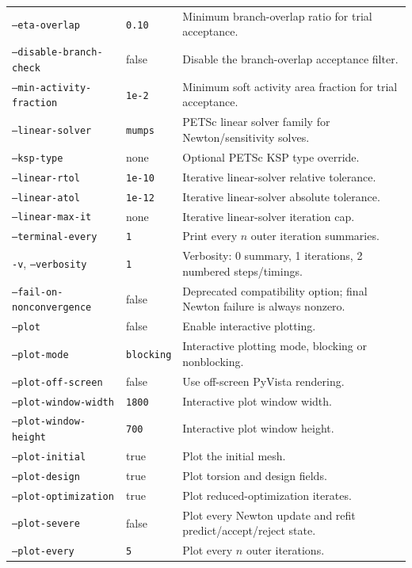 \documentclass[11pt]{article}
\begin{document}
\begin{longtable}{>{\raggedright\arraybackslash}p{}
                  >{\raggedright\arraybackslash}p{}
                  >{\raggedright\arraybackslash}p{}}
\texttt{--eta-overlap} & \texttt{0.10} & Minimum branch-overlap ratio for trial acceptance. \\
\texttt{--disable-branch-check} & false & Disable the branch-overlap acceptance filter. \\
\texttt{--min-activity-fraction} & \texttt{1e-2} & Minimum soft activity area fraction for trial acceptance. \\
\texttt{--linear-solver} & \texttt{mumps} & PETSc linear solver family for Newton/sensitivity solves. \\
\texttt{--ksp-type} & none & Optional PETSc KSP type override. \\
\texttt{--linear-rtol} & \texttt{1e-10} & Iterative linear-solver relative tolerance. \\
\texttt{--linear-atol} & \texttt{1e-12} & Iterative linear-solver absolute tolerance. \\
\texttt{--linear-max-it} & none & Iterative linear-solver iteration cap. \\
\texttt{--terminal-every} & \texttt{1} & Print every $n$ outer iteration summaries. \\
\texttt{-v}, \texttt{--verbosity} & \texttt{1} & Verbosity: 0 summary, 1 iterations, 2 numbered steps/timings. \\
\texttt{--fail-on-nonconvergence} & false & Deprecated compatibility option; final Newton failure is always nonzero. \\
\texttt{--plot} & false & Enable interactive plotting. \\
\texttt{--plot-mode} & \texttt{blocking} & Interactive plotting mode, blocking or nonblocking. \\
\texttt{--plot-off-screen} & false & Use off-screen PyVista rendering. \\
\texttt{--plot-window-width} & \texttt{1800} & Interactive plot window width. \\
\texttt{--plot-window-height} & \texttt{700} & Interactive plot window height. \\
\texttt{--plot-initial} & true & Plot the initial mesh. \\
\texttt{--plot-design} & true & Plot torsion and design fields. \\
\texttt{--plot-optimization} & true & Plot reduced-optimization iterates. \\
\texttt{--plot-severe} & false & Plot every Newton update and refit predict/accept/reject state. \\
\texttt{--plot-every} & \texttt{5} & Plot every $n$ outer iterations. \\

\end{longtable}
\end{document}
